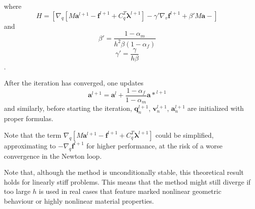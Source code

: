 \documentclass{digitaldynamics}
\def\vect#1{\bm{#1}}
\def\matr#1{{#1}}
\begin{document}
 
where 
\[
\matr{H} = 
\left[
      \nabla_q \left[ \matr{M}\vect{a}^{l+1} -\vect{f}^{l+1} + \matr{C}_q^T\vect{\lambda}^{l+1} \right]
- \gamma'   \nabla_v \vect{f}^{l+1}
+ \beta'  \matr{M}\vect{a} -
\right]
\]
and
\[
\beta' = \frac{1-\alpha_m}{h^2 \beta(1-\alpha_f)}
\]
\[
\gamma' = \frac{\gamma}{h \beta}
\].

After the iteration has converged, one updates
\[
\vect{a}^{l+1} = \vect{a}^{l} + \frac{1-\alpha_f}{1-\alpha_m} \vect{a*}^{l+1}
\]
and similarly, before starting the iteration, $\vect{q}^{l+1}_{n}$, $\vect{v}^{l+1}_{n}$, $\vect{a}^{l+1}_{n}$ are initialized with proper formulas.

Note that the term 
$\nabla_q \left[ \matr{M}\vect{a}^{l+1} -\vect{f}^{l+1} + \matr{C}_q^T\vect{\lambda}^{l+1} \right]$ 
could be simplified, approximating to $- \nabla_q \vect{f}^{l+1} $ for higher performance, at the risk of a worse convergence in the Newton loop.

Note that, although the method is unconditionally stable, this theoretical result
holds for linearly stiff problems. This means that the method might still diverge if
too large $h$ is used in real cases that feature marked nonlinear geometric behaviour or highly nonlinear material properties. 
\end{document}
